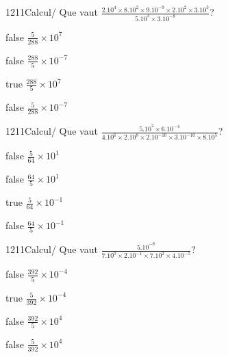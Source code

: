 \documentclass[11pt]{article}
\begin{document}
            \begin{question}{1211}{Calcul}{}{/}
                Que vaut $\frac{2.10^{4}\times 8.10^{2}\times 9.10^{-9}\times 2.10^{2}\times 3.10^{3}}{5.10^{3}\times 3.10^{-8}}$?
            \end{question}
            
            \begin{reponses}
                \item[false] $\frac{5}{288}\times 10^{7}$
                \item[false] $\frac{288}{5}\times 10^{-7}$
                \item[true] $\frac{288}{5}\times 10^{7}$
                \item[false] $\frac{5}{288}\times 10^{-7}$
            \end{reponses}
            
            \begin{question}{1211}{Calcul}{}{/}
                Que vaut $\frac{5.10^{2}\times 6.10^{-4}}{4.10^{6}\times 2.10^{8}\times 2.10^{-10}\times 3.10^{-10}\times 8.10^{5}}$?
            \end{question}
            
            \begin{reponses}
                \item[false] $\frac{5}{64}\times 10^{1}$
                \item[false] $\frac{64}{5}\times 10^{1}$
                \item[true] $\frac{5}{64}\times 10^{-1}$
                \item[false] $\frac{64}{5}\times 10^{-1}$
            \end{reponses}
            
            \begin{question}{1211}{Calcul}{}{/}
                Que vaut $\frac{5.10^{-8}}{7.10^{0}\times 2.10^{-1}\times 7.10^{2}\times 4.10^{-5}}$?
            \end{question}
            
            \begin{reponses}
                \item[false] $\frac{392}{5}\times 10^{-4}$
                \item[true] $\frac{5}{392}\times 10^{-4}$
                \item[false] $\frac{392}{5}\times 10^{4}$
                \item[false] $\frac{5}{392}\times 10^{4}$
            \end{reponses}
            
\end{document}

